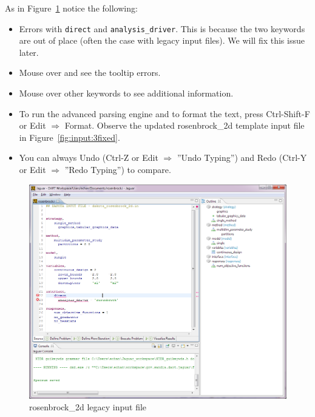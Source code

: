 As in Figure~\ref{fig:input:2rosenbrockfile} notice the following:
\begin{itemize}      
\item Errors with \texttt{direct} and \texttt{analysis\_driver}. This is because the two keywords are out of place (often the case with legacy input files). We will fix this issue later.
\item Mouse over and see the tooltip errors.
\item Mouse over other keywords to see additional information.
\item To run the advanced parsing engine and to format the text, press Ctrl-Shift-F or Edit $\Rightarrow$ Format. Observe the updated rosenbrock\_2d template input file in Figure~\ref{fig:input:3fixed}. 
\item You can always Undo (Ctrl-Z or Edit $\Rightarrow$ ''Undo Typing'') and Redo (Ctrl-Y or Edit $\Rightarrow$ ''Redo Typing'') to compare.
\end{itemize}
\begin{figure}[htbp]
  \centering
  \includegraphics[scale=0.6]{images/2rosenbrockfile}
  \caption{rosenbrock\_2d legacy input file}
  \label{fig:input:2rosenbrockfile}
\end{figure}


